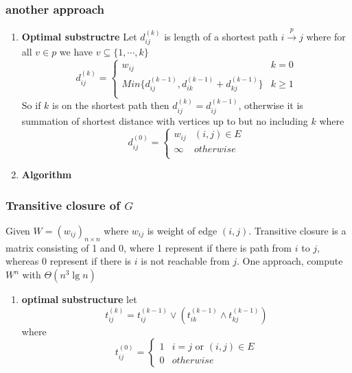 \documentclass[11pt]{article}
\begin{document}
\subsubsection*{another approach}


\begin{enumerate}
  \item \textbf{Optimal substructre} Let $d_{ij}^{(k)}$ is length of a shortest path $i \overset{p}{\to} j$ where for all $v\in p$ we have $v \subseteq \{ 1,\cdots, k\}$
  \[
    d_{ij}^{(k)} =
    \begin{cases}
      w_{ij} & k = 0 \\
      Min \{ d_{ij}^{(k-1)}, d_{ik}^{(k-1)} + d_{kj}^{(k-1)} \} & k \geq 1\\
    \end{cases}
  \]
  So if $k$ is on the shortest path then $d_{ij}^{(k)} = d_{ij}^{(k-1)}$, otherwise it is summation of shortest distance with vertices up to but no including $k$
  where
  \[
    d_{ij}^{(0)} =
    \begin{cases}
      w_{ij} & (i,j) \in E\\
      \infty & otherwise\\
    \end{cases}
  \]
  \item \textbf{Algorithm}


  \begin{algorithm}[H]
  \end{algorithm}

\end{enumerate}



\subsubsection*{Transitive closure of $G$}

Given $W = (w_{ij})_{n\times n}$ where $w_{ij}$ is weight of edge $(i, j)$. Transitive closure is a matrix consisting of 1 and 0, where 1 represent if there is path from $i$ to $j$, whereas 0 represent if there is $i$ is not reachable from $j$. One approach, compute $W^n$ with $\Theta(n^3 \lg n)$

\begin{enumerate}
  \item \textbf{optimal substructure} let
  \[
    t_{ij}^{(k)} =  t_{ij}^{(k-1)} \lor (t_{ik}^{(k-1)} \land t_{kj}^{(k-1)})
  \]
  where
  \[
    t_{ij}^{(0)}=
    \begin{cases}
      1 & i = j \text{ or } (i,j)\in E \\
      0 & otherwise
    \end{cases}
  \]
\end{enumerate}
\end{document}
